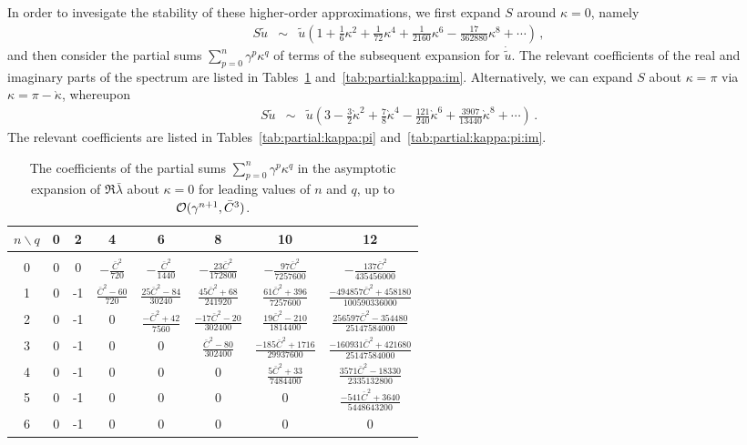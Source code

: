 \documentclass[12pt,a5paper]{article}
\begin{document}
In order to invesigate the stability of these higher-order approximations, we first expand $S$ around $\kappa=0$, namely
\begin{eqnarray}
S\tilde{u} & \sim & \tilde{u}\left(1+\frac{1}{6}\kappa^2+\frac{1}{72}\kappa^4
+\frac{1}{2160}\kappa^6-\frac{17}{362880}\kappa^8+\cdots\right)\,,
\end{eqnarray}
and then consider the partial sums $\sum_{p=0}^{n}\gamma^p\kappa^q$ of terms of the
subsequent expansion for $\dot{\tilde{u}}$. The relevant coefficients of the
real and imaginary parts of the spectrum are listed in Tables~\ref{tab:partial:kappa}
and~\ref{tab:partial:kappa:im}.
Alternatively, we can expand $S$ about $\kappa=\pi$ via $\kappa=\pi-\grave{\kappa}$, whereupon
\begin{eqnarray}
S\tilde{u} & \sim & \tilde{u}\left(3-\frac{3}{2}\grave{\kappa}^2+\frac{7}{8}\grave{\kappa}^4
-\frac{121}{240}\grave{\kappa}^6+\frac{3907}{13440}\grave{\kappa}^8+\cdots\right)\,.
\end{eqnarray}
 The relevant coefficients are listed in Tables~\ref{tab:partial:kappa:pi} and~\ref{tab:partial:kappa:pi:im}.

\begin{table}
\caption{The coefficients of the partial sums $\sum_{p=0}^{n}\gamma^p\kappa^q$ in the 
asymptotic expansion of $\Re\bar{\lambda}$ about $\kappa=0$ for leading values of $n$ and $q$, up to 
${\cal O}(\gamma^{n+1},\bar{C}^3)$.}
\label{tab:partial:kappa}
\centering
\begin{tabular}{cccccccc}
\hline
$n\backslash q$ & 0 & 2 & 4 & 6 & 8 & 10 & 12\\
\hline
&&&&&&&\\[-2ex]
0 & 0 & 0 & $-\frac{\bar{C}^2}{720}$ & $-\frac{\bar{C}^2}{1440}$ & $-\frac{23\bar{C}^2}{172800}$        
   & $-\frac{97\bar{C}^2}{7257600}$            & $-\frac{137\bar{C}^2}{435456000}$
\\[1ex]
1 & 0 & -1 & $\frac{\bar{C}^2-60}{720}$ & $\frac{25\bar{C}^2-84}{30240}$
   & $\frac{45\bar{C}^2+68}{241920}$  & $\frac{61\bar{C}^2+396}{7257600}$
   & $\frac{-494857\bar{C}^2+458180}{100590336000}$
\\[1ex]
2 & 0 & -1 & 0 & $\frac{-\bar{C}^2+42}{7560}$ & $\frac{-17\bar{C}^2-20}{302400}$
   & $\frac{19\bar{C}^2-210}{1814400}$ & $\frac{256597\bar{C}^2-354480}{25147584000}$
\\[1ex]
3 & 0 & -1 & 0 & 0 & $\frac{\bar{C}^2-80}{302400}$ & $\frac{-185\bar{C}^2+1716}{29937600}$
   & $\frac{-160931\bar{C}^2+421680}{25147584000}$
\\[1ex]
4 & 0 & -1 & 0 & 0 & 0 & $\frac{5\bar{C}^2+33}{7484400}$ 
   & $\frac{3571\bar{C}^2-18330}{2335132800}$
\\[1ex]
5 & 0 & -1 & 0 & 0 & 0 & 0  & $\frac{-541\bar{C}^2+3640}{5448643200}$
\\[1ex]
6 & 0 & -1 & 0 & 0 & 0 & 0 & 0\\[1ex]
\hline
\end{tabular}
\end{table}
\end{document}
